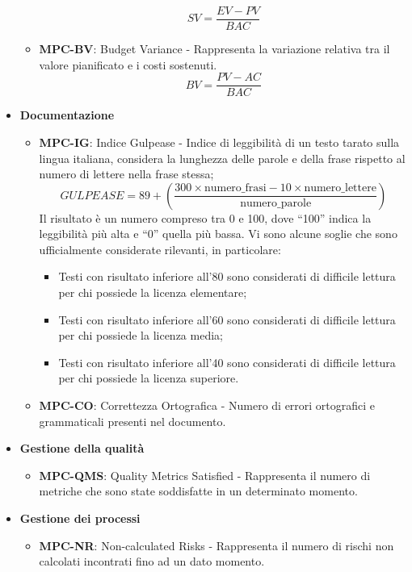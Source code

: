 \documentclass[8pt]{article}
\begin{document}
\begin{itemize}
\begin{itemize}
                \begin{equation}
                SV = \frac{EV - PV}{BAC}
                \end{equation}
            \item \textbf{MPC-BV}: Budget Variance - Rappresenta la variazione relativa tra il valore pianificato e i costi sostenuti.
                \begin{equation}
                BV = \frac{PV - AC}{BAC}
                \end{equation}
        \end{itemize}        
       \clearpage
       \item \textbf{Documentazione}
        \begin{itemize}
            \item \textbf{MPC-IG}: Indice Gulpease - Indice di leggibilità di un testo tarato sulla
                lingua italiana, considera la lunghezza delle parole e della frase rispetto al
                numero di lettere nella frase stessa;
                \begin{equation}
                GULPEASE = 89 + \left(\frac{{300 \times \text{numero\_frasi} - 10 \times \text{numero\_lettere}}}{{\text{numero\_parole}}}\right)
                \end{equation}
                Il risultato è un numero compreso tra 0 e 100, dove ``100'' indica la leggibilità più alta e ``0'' quella più bassa. Vi sono alcune soglie che sono ufficialmente considerate rilevanti, in particolare:
                \begin{itemize}
                    \item Testi con risultato inferiore all'80 sono considerati di difficile lettura per chi possiede la licenza elementare;
                    \item Testi con risultato inferiore all'60 sono considerati di difficile lettura per chi possiede la licenza media;
                    \item Testi con risultato inferiore all'40 sono considerati di difficile lettura per chi possiede la licenza superiore.
                \end{itemize}
            \item \textbf{MPC-CO}: Correttezza Ortografica - Numero di errori ortografici e grammaticali presenti nel documento.
        \end{itemize}
    \item \textbf{Gestione della qualità}
        \begin{itemize}
            \item \textbf{MPC-QMS}: Quality Metrics Satisfied - Rappresenta il numero di metriche che sono state soddisfatte in un determinato momento.
        \end{itemize}
    \item \textbf{Gestione dei processi}
        \begin{itemize}
            \item \textbf{MPC-NR}: Non-calculated Risks - Rappresenta il numero di rischi non calcolati incontrati fino ad un dato momento.
        \end{itemize}
\end{itemize}
\end{document}
